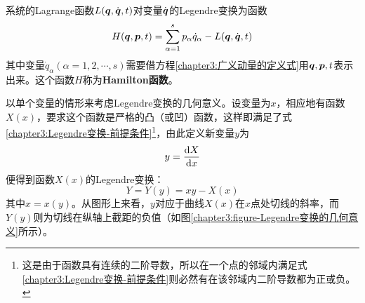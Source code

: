 系统的Lagrange函数$L(\boldsymbol{q},\dot{\boldsymbol{q}},t)$对变量$\dot{\boldsymbol{q}}$的Legendre变换为函数
\begin{equation}
	H(\boldsymbol{q},\boldsymbol{p},t) = \sum_{\alpha=1}^s p_\alpha\dot{q}_\alpha - L(\boldsymbol{q},\dot{\boldsymbol{q}},t)
	\label{chapter3:Hamilton函数定义}
\end{equation}
其中变量$\dot{q}_\alpha(\alpha=1,2,\cdots,s)$需要借方程\eqref{chapter3:广义动量的定义式}用$\boldsymbol{q},\boldsymbol{p},t$表示出来。这个函数$H$称为{\bf Hamilton函数}。

\begin{example}[Legendre变换的几何意义]
以单个变量的情形来考虑Legendre变换的几何意义。设变量为$x$，相应地有函数$X(x)$，要求这个函数是严格的凸（或凹）函数，这样即满足了式\eqref{chapter3:Legendre变换-前提条件}\footnote{这是由于函数具有连续的二阶导数，所以在一个点的邻域内满足式\eqref{chapter3:Legendre变换-前提条件}则必然有在该邻域内二阶导数都为正或负。}，由此定义新变量$y$为
\begin{equation*}
	y = \dfrac{\mathrm{d} X}{\mathrm{d} x}
\end{equation*}
便得到函数$X(x)$的Legendre变换：
\begin{equation*}
	Y = Y(y) = xy - X(x)
\end{equation*}
其中$x=x(y)$。从图形上来看，$y$对应于曲线$X(x)$在$x$点处切线的斜率，而$Y(y)$则为切线在纵轴上截距的负值（如图\ref{chapter3:figure-Legendre变换的几何意义}所示）。


\end{example}
